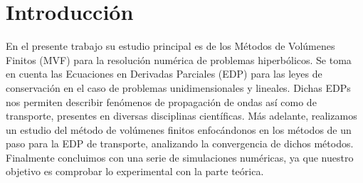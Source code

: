 \chapter*{Introducción}

En el presente trabajo su estudio principal es de los Métodos de
Volúmenes Finitos (MVF) para la resolución numérica de problemas
hiperbólicos.
Se toma en cuenta las Ecuaciones en Derivadas Parciales (EDP) para
las leyes de conservación en el caso de problemas unidimensionales y
lineales.
Dichas EDPs nos permiten describir fenómenos de propagación de ondas
así como de transporte, presentes en diversas disciplinas
científicas.
Más adelante, realizamos un estudio del método de volúmenes finitos
enfocándonos en los métodos de un paso para la EDP de transporte,
analizando la convergencia de dichos métodos.
Finalmente concluimos con una serie de simulaciones numéricas, ya que
nuestro objetivo es comprobar lo experimental con la parte teórica.